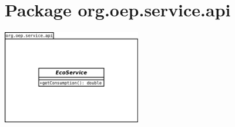 \documentclass[a4paper, 11pt]{report}
\begin{document}
\section{Package org.oep.service.api}
	\begin{centering}
		\includegraphics[width=0.45\textwidth]{figures/EcoPattern_Service_Api_Classes}
	\end{centering}
\end{document}
